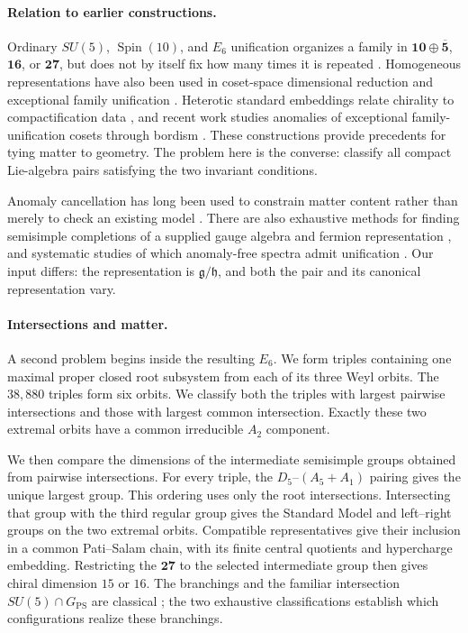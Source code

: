 \documentclass[11pt]{article}
\theoremstyle{remark}
\begin{document}
\paragraph{Relation to earlier constructions.}
Ordinary \(SU(5)\), \(\operatorname{Spin}(10)\), and \(E_6\) unification
organizes a family in \(\mathbf{10}\oplus\overline{\mathbf5}\),
\(\mathbf{16}\), or \(\mathbf{27}\), but does not by itself fix how many
times it is repeated \cite{GeorgiGlashow,FritzschMinkowski,GurseyRamondSikivie}.
Homogeneous representations have also been used in coset-space dimensional
reduction and exceptional family unification
\cite{ForgacsManton,MantonFermions,ChaplineSlansky,ChaplineGrossman,
DouzasEtAl,KugoYanagida,ItohKugoKunitomo}. Heterotic standard embeddings relate
chirality to compactification data \cite{CandelasHorowitzStromingerWitten},
and recent work studies anomalies of exceptional family-unification cosets
through bordism \cite{SugenoWada}.
These constructions provide precedents for tying matter to geometry. The
problem here is the converse: classify all compact Lie-algebra pairs
satisfying the two invariant conditions.

Anomaly cancellation has long been used to constrain matter content rather
than merely to check an existing model
\cite{BouchiatIliopoulosMeyer,GrossJackiw}. There are also exhaustive methods
for finding semisimple completions of a supplied gauge algebra and fermion
representation \cite{GomesRuhdorferToobySmith}, and systematic studies of
which anomaly-free spectra admit unification \cite{HermsRuhdorfer}.
Our input differs: the representation is \(\mathfrak g/\mathfrak h\),
and both the pair and its canonical representation vary.

\paragraph{Intersections and matter.}
A second problem begins inside the resulting \(E_6\). We form triples
containing one maximal proper closed root subsystem from each of its three
Weyl orbits. The \(38{,}880\) triples form six orbits. We classify both the
triples with largest pairwise intersections and those with largest common
intersection. Exactly these two extremal orbits have a common irreducible
\(A_2\) component.

We then compare the dimensions of the intermediate semisimple groups
obtained from pairwise intersections. For every triple, the
\(D_5\)--\((A_5+A_1)\) pairing gives the unique largest group.
This ordering uses only the root intersections. Intersecting that group with
the third regular group gives the Standard Model and left--right groups on
the two extremal orbits. Compatible representatives give their inclusion
in a common Pati--Salam chain, with its finite central quotients and
hypercharge embedding. Restricting the \(\mathbf{27}\) to the selected
intermediate group then gives chiral dimension \(15\) or \(16\).
The branchings and the familiar intersection
\(SU(5)\cap G_{\mathrm{PS}}\) are classical
\cite{BaezHuerta,Krasnov,TodorovDuboisViolette}; the two exhaustive classifications establish which configurations realize
these branchings.
\end{document}
